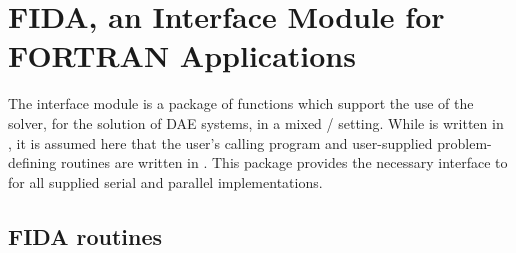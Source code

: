 \chapter{FIDA, an Interface Module for FORTRAN Applications}\label{s:fcmix}

The {\fida} interface module is a package of {\CC} functions which support
the use of the {\ida} solver, for the solution of DAE systems, in a mixed
{\F}/{\CC} setting.  While {\ida} is written in {\CC}, it is assumed here
that the user's calling program and user-supplied problem-defining routines
are written in {\F}. This package provides the necessary interface to {\ida}
for all supplied serial and parallel {\nvector} implementations.



\section{FIDA routines}\label{sss:fidaroutines}

